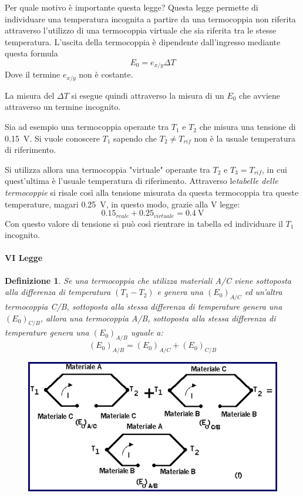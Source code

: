 \documentclass[a4paper, 15pt]{article}
\newtheorem*{definizione}{Definizione}
\begin{document}
	Per quale motivo è importante questa legge?
	Questa legge permette di individuare una temperatura incognita a partire da una termocoppia non riferita attraverso l'utilizzo di una termocoppia virtuale che sia riferita tra le stesse temperatura.
\newpage	
	L'uscita della termocoppia è dipendente dall'ingresso mediante questa formula
	\[E_0 = e_{x/y}\Delta T\]
	Dove il termine $e_{x/y}$ non è costante.
	
	La misura del $\Delta T$ si esegue quindi attraverso la misura di un $E_0$ che avviene attraverso un termine incognito. \newline
	
	Sia ad esempio una termocoppia operante tra $T_1$ e $T_2$ che misura una tensione di \SI{0.15}{\volt}. Si vuole conoscere $T_1$ sapendo che $T_2\ne T_{rif}$ non è la usuale temperatura di riferimento. 
	
	Si utilizza allora una termocoppia "virtuale" operante tra $T_2$ e $T_3=T_{rif}$, in cui quest'ultima è l'usuale temperatura di riferimento. 
	Attraverso le\textit{tabelle delle termocoppie} si risale così alla tensione misurata da questa termocoppia tra queste temperature, magari \SI{0.25}{\volt}, in questo modo, grazie alla V legge: 
	\[0.15_{reale} + 0.25_{virtuale} = \SI{0.4}{\volt}\]
	Con questo valore di tensione si può così rientrare in tabella ed individuare il $T_1$ incognito. 
	 
\paragraph{VI Legge} 		
\begin{definizione}		
	Se una termocoppia che utilizza materiali A/C viene sottoposta alla differenza
	di temperatura $(T_1 - T_2)$ e genera una $(E_0)_{A/C}$ ed un'altra termocoppia C/B,
	sottoposta alla stessa differenza di temperature genera una $(E_0)_{C/B}$, allora una
	termocoppia A/B, sottoposta alla stessa differenza di temperature genera una $(E_0)_{A/B}$ uguale a:
	\[(E_0)_{A/B} = (E_0)_{A/C} + (E_0)_{C/B}\]
\end{definizione}		
	\begin{figure}[H]
		\centering
		\includegraphics[width=0.5\linewidth]{immagini/screenshot025}
		\label{fig:screenshot025}
	\end{figure}
\end{document}
